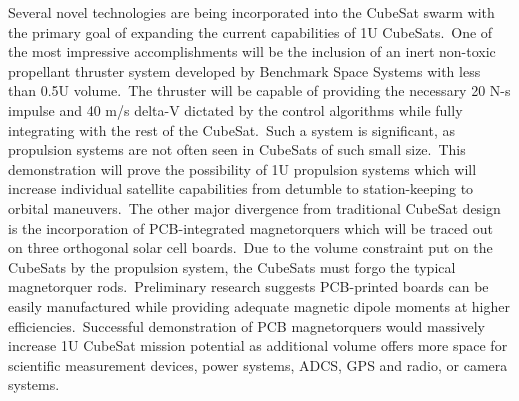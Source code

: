 Several novel technologies are being incorporated into the CubeSat
swarm with the primary goal of expanding the current capabilities of
1U CubeSats. One of the most impressive accomplishments will be the
inclusion of an inert non-toxic propellant thruster system developed
by Benchmark Space Systems with less than 0.5U volume. The thruster
will be capable of providing the necessary 20 N-s impulse and 40 m/s
delta-V dictated by the control algorithms while fully integrating
with the rest of the CubeSat. Such a system is significant, as
propulsion systems are not often seen in CubeSats of such small size. This demonstration will prove the possibility of 1U propulsion systems
which will increase individual satellite capabilities from detumble to
station-keeping to orbital maneuvers. The other major divergence from
traditional CubeSat design is the incorporation of PCB-integrated
magnetorquers which will be traced out on three orthogonal solar cell
boards. Due to the volume constraint put on the CubeSats by the
propulsion system, the CubeSats must forgo the typical magnetorquer
rods. Preliminary research suggests PCB-printed boards can be easily
manufactured while providing adequate magnetic dipole moments at
higher efficiencies. Successful demonstration of PCB magnetorquers
would massively increase 1U CubeSat mission potential as additional
volume offers more space for scientific measurement devices, power
systems, ADCS, GPS and radio, or camera systems. 

